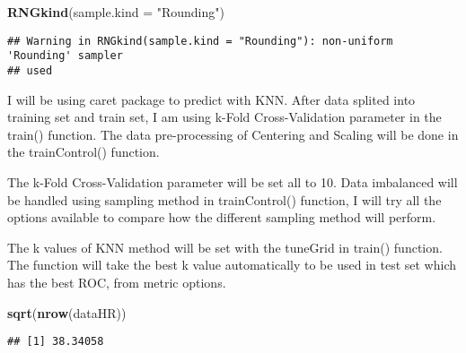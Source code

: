 \documentclass[
]{article}
\newenvironment{Shaded}{\begin{snugshade}}{\end{snugshade}}
\newcommand{\DataTypeTok}[1]{\textcolor[rgb]{0.13,0.29,0.53}{#1}}
\newcommand{\DecValTok}[1]{\textcolor[rgb]{0.00,0.00,0.81}{#1}}
\newcommand{\FloatTok}[1]{\textcolor[rgb]{0.00,0.00,0.81}{#1}}
\newcommand{\KeywordTok}[1]{\textcolor[rgb]{0.13,0.29,0.53}{\textbf{#1}}}
\newcommand{\NormalTok}[1]{#1}
\newcommand{\OperatorTok}[1]{\textcolor[rgb]{0.81,0.36,0.00}{\textbf{#1}}}
\newcommand{\OtherTok}[1]{\textcolor[rgb]{0.56,0.35,0.01}{#1}}
\newcommand{\StringTok}[1]{\textcolor[rgb]{0.31,0.60,0.02}{#1}}
\begin{document}
\begin{Shaded}
\begin{Highlighting}[]
\KeywordTok{RNGkind}\NormalTok{(}\DataTypeTok{sample.kind =} \StringTok{"Rounding"}\NormalTok{)}
\end{Highlighting}
\end{Shaded}

\begin{verbatim}
## Warning in RNGkind(sample.kind = "Rounding"): non-uniform 'Rounding' sampler
## used
\end{verbatim}

\begin{Shaded}
\end{Shaded}

I will be using caret package to predict with KNN. After data splited
into training set and train set, I am using k-Fold Cross-Validation
parameter in the train() function. The data pre-processing of Centering
and Scaling will be done in the trainControl() function.

The k-Fold Cross-Validation parameter will be set all to 10. Data
imbalanced will be handled using sampling method in trainControl()
function, I will try all the options available to compare how the
different sampling method will perform.

The k values of KNN method will be set with the tuneGrid in train()
function. The function will take the best k value automatically to be
used in test set which has the best ROC, from metric options.

\begin{Shaded}
\begin{Highlighting}[]
\KeywordTok{sqrt}\NormalTok{(}\KeywordTok{nrow}\NormalTok{(dataHR))}
\end{Highlighting}
\end{Shaded}

\begin{verbatim}
## [1] 38.34058
\end{verbatim}
\end{document}
